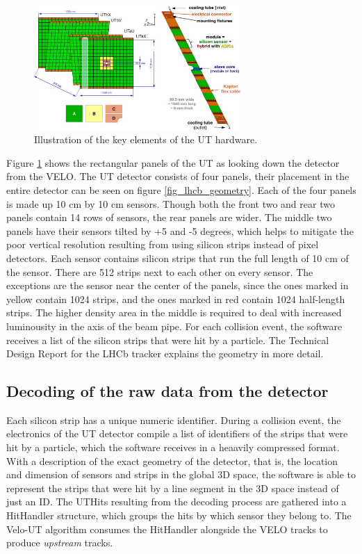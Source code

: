 \documentclass[12pt]{article}
\begin{document}
\begin{figure}[H]
	\begin{center}
		\includegraphics[width=0.7\textwidth]{detector_ut_geometry}
	\end{center}
	\caption{Illustration of the key elements of the UT hardware.}
	\label{fig_ut_geometry}
\end{figure}

Figure \ref{fig_ut_geometry} shows the rectangular panels of the UT as looking down the detector from the VELO. The UT detector consists of four panels, their placement in the entire detector can be seen on figure \ref{fig_lhcb_geometry}. Each of the four panels is made up 10 cm by 10 cm sensors. Though both the front two and rear two panels contain 14 rows of sensors, the rear panels are wider. The middle two panels have their sensors tilted by +5 and -5 degrees, which helps to mitigate the poor vertical resolution resulting from using silicon strips instead of pixel detectors. Each sensor contains silicon strips that run the full length of 10 cm of the sensor. There are 512 strips next to each other on every sensor. The exceptions are the sensor near the center of the panels, since the ones marked in yellow contain 1024 strips, and the ones marked in red contain 1024 half-length strips. The higher density area in the middle is required to deal with increased luminousity in the axis of the beam pipe. For each collision event, the software receives a list of the silicon strips that were hit by a particle. The Technical Design Report for the LHCb tracker\cite{tracker_tdr} explains the geometry in more detail.

\subsection{Decoding of the raw data from the detector}

Each silicon strip has a unique numeric identifier. During a collision event, the electronics of the UT detector compile a list of identifiers of the strips that were hit by a particle, which the software receives in a heaavily compressed format. With a description of the exact geometry of the detector, that is, the location and dimension of sensors and strips in the global 3D space, the software is able to represent the strips that were hit by a line segment in the 3D space instead of just an ID. The UTHits resulting from the  decoding process are gathered into a HitHandler structure, which groups the hits by which sensor they belong to. The Velo-UT algorithm consumes the HitHandler alongside the VELO tracks to produce \textit{upstream} tracks.
\end{document}
